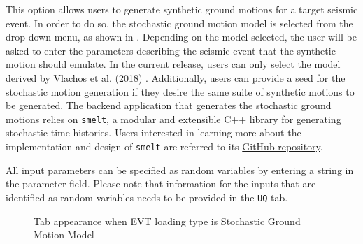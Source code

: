 This option allows users to generate synthetic ground motions for a
target seismic event. In order to do so, the stochastic ground motion
model is selected from the drop-down menu, as shown
in . Depending on the model selected, the
user will be asked to enter the parameters describing the seismic
event that the synthetic motion should emulate. In the current
release, users can only select the model derived by Vlachos et
al. (2018) \cite{vlachos2018predictive}. Additionally, users can
provide a seed for the stochastic motion generation if they desire the
same suite of synthetic motions to be generated. The backend
application that generates the stochastic ground motions relies
on \texttt{smelt}, a modular and extensible C++ library for generating
stochastic time histories. Users interested in learning more about the
implementation and design of
\texttt{smelt} are referred to its
\href{https://github.com/shellshocked2003/Stochastic-Loading-Module}{GitHub repository}.

All input parameters can be specified as random variables by entering
a string in the parameter field. Please note that information for the
inputs that are identified as random variables needs to be provided in
the \texttt{UQ} tab.

\begin{figure}[!htbp]
  \caption{Tab appearance when EVT loading type is Stochastic Ground
  Motion Model}
  \label{fig:stochastic_loading}
\end{figure}
